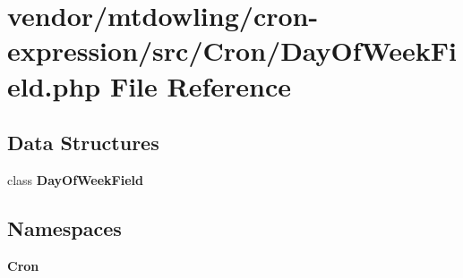 \section{vendor/mtdowling/cron-\/expression/src/\+Cron/\+Day\+Of\+Week\+Field.php File Reference}
\label{_day_of_week_field_8php}
\subsection*{Data Structures}
\begin{DoxyCompactItemize}
\item 
class {\bf Day\+Of\+Week\+Field}
\end{DoxyCompactItemize}
\subsection*{Namespaces}
\begin{DoxyCompactItemize}
\item 
 {\bf Cron}
\end{DoxyCompactItemize}
